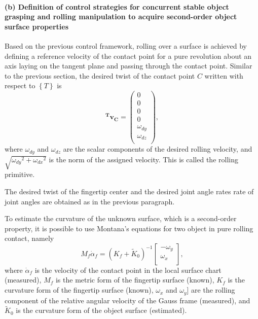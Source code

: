 \paragraph{(b) Definition of control strategies for concurrent stable object grasping and rolling manipulation to acquire second-order object surface properties}

Based on the previous control framework, rolling over a surface is achieved by defining a reference velocity of the contact point for a pure revolution about an axis laying on the tangent plane and passing through the contact point. Similar to the previous section, the desired twist of the contact point $C$ written with respect to $\left\lbrace T \right\rbrace$ is
\begin{equation}
    \bm{^Tv_C}=\left(
    \begin{array}{c}
        0\\
        0\\
        0\\
        0\\
        \omega_{dy}\\
        \omega_{dz}\\
    \end{array}\right),
\end{equation}
where $\omega_{dy}$ and $\omega_{dz}$ are the scalar components of the desired rolling velocity, and $\sqrt{{\omega_{dy}}^2+{\omega_{dx}}^2}$ is the norm of the assigned velocity. This is called the rolling primitive.

The desired twist of the fingertip center and the desired joint angle rates rate of joint angles are obtained as in the previous paragraph.

To estimate the curvature of the unknown surface, which is a second-order property, it is possible to use Montana's equations for two object in pure rolling contact, namely
\begin{equation}
M_f \dot{\alpha}_f=(K_f+\tilde{K}_0)^{-1}
\left[
\begin{array}{c}
-\omega_y\\
\omega_x\\
\end{array}
\right],
\label{eq:montana}
\end{equation}
where $\dot{\alpha}_f$ is the velocity of the contact point in the local surface chart (measured), $M_f$ is the metric form of the fingertip surface (known), $K_f$ is the curvature form of the fingertip surface (known), $\omega_x$ and $\omega_y$] are the rolling component of the relative angular velocity of the Gauss frame (measured), and $\tilde{K}_0$ is the curvature form of the object surface (estimated).

